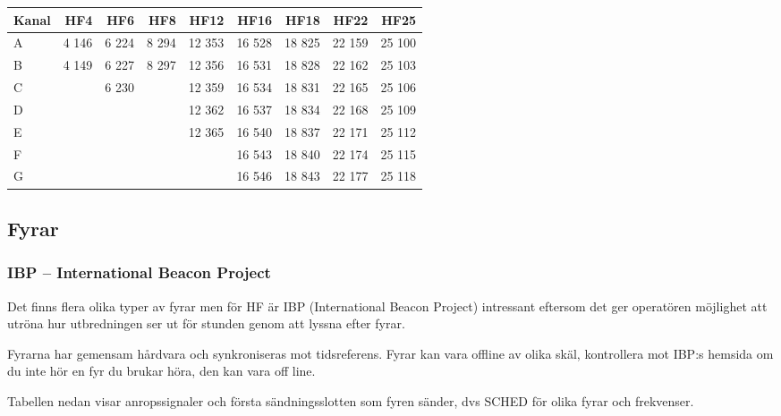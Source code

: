 \begin{longtable}{lrrrrrrrr}
\textbf{Kanal} & \textbf{HF4} & \textbf{HF6} & \textbf{HF8} & \textbf{HF12} & \textbf{HF16} & \textbf{HF18} & \textbf{HF22} & \textbf{HF25} \\
\hline
\endhead

A & 4 146 & 6 224 & 8 294 & 12 353 & 16 528 & 18 825 & 22 159 & 25 100 \\
B & 4 149 & 6 227 & 8 297 & 12 356 & 16 531 & 18 828 & 22 162 & 25 103 \\
C &       & 6 230 &       & 12 359 & 16 534 & 18 831 & 22 165 & 25 106 \\
D &       &       &       & 12 362 & 16 537 & 18 834 & 22 168 & 25 109 \\
E &       &       &       & 12 365 & 16 540 & 18 837 & 22 171 & 25 112 \\
F &       &       &       &        & 16 543 & 18 840 & 22 174 & 25 115 \\
G &       &       &       &        & 16 546 & 18 843 & 22 177 & 25 118 \\
\end{longtable}

\clearpage
\subsection{Fyrar}

\subsubsection{IBP -- International Beacon Project}

Det finns flera olika typer av fyrar men för HF är IBP (International Beacon Project) intressant eftersom det ger operatören möjlighet att utröna hur utbredningen ser ut för stunden genom att lyssna efter fyrar. 

Fyrarna har gemensam hårdvara och synkroniseras mot tidsreferens. Fyrar kan vara offline av olika skäl, kontrollera mot IBP:s hemsida om du inte hör en fyr du brukar höra, den kan vara off line.

Tabellen nedan visar anropssignaler och första sändningsslotten som fyren sänder, dvs SCHED för olika fyrar och frekvenser.

